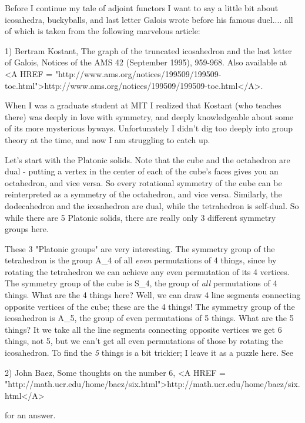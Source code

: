 


Before I continue my tale of adjoint functors I want to say a little
bit about icosahedra, buckyballs, and last letter Galois wrote before
his famous duel.... all of which is taken from the following marvelous
article:

1) Bertram Kostant, The graph of the truncated icosahedron and the last
letter of Galois, Notices of the AMS 42 (September 1995), 959-968. 
Also available at
<A HREF = "http://www.ams.org/notices/199509/199509-toc.html">http://www.ams.org/notices/199509/199509-toc.html</A>.

When I was a graduate student at MIT I realized that Kostant (who
teaches there) was deeply in love with symmetry, and deeply
knowledgeable about some of its more mysterious byways.  Unfortunately I
didn't dig too deeply into group theory at the time, and now I am
struggling to catch up.

Let's start with the Platonic solids.  Note that the cube and the
octahedron are dual - putting a vertex in the center of each of the
cube's faces gives you an octahedron, and vice versa.  So every
rotational symmetry of the cube can be reinterpreted as a symmetry of
the octahedron, and vice versa.  Similarly, the dodecahedron and the
icosahedron are dual, while the tetrahedron is self-dual.  So while
there are 5 Platonic solids, there are really only 3 different symmetry
groups here.  


These 3 "Platonic groups" are very interesting.  The symmetry
group of the tetrahedron is the group A_{4} of all \emph{even}
permutations of 4 things, since by rotating the tetrahedron we can
achieve any even permutation of its 4 vertices.  The symmetry group of
the cube is S_{4}, the group of \emph{all} permutations of 4
things.  What are the 4 things here?  Well, we can draw 4 line segments
connecting opposite vertices of the cube; these are the 4 things!  The
symmetry group of the icosahedron is A_{5}, the group of even
permutations of 5 things.  What are the 5 things?  It we take all the
line segments connecting opposite vertices we get 6 things, not 5, but
we can't get all even permutations of those by rotating the icosahedron.
To find the \emph{5} things is a bit trickier; I leave it as a puzzle
here.  See

2) John Baez, Some thoughts on the number 6, 
<A HREF =
"http://math.ucr.edu/home/baez/six.html">http://math.ucr.edu/home/baez/six.html</A>

for an answer.  

